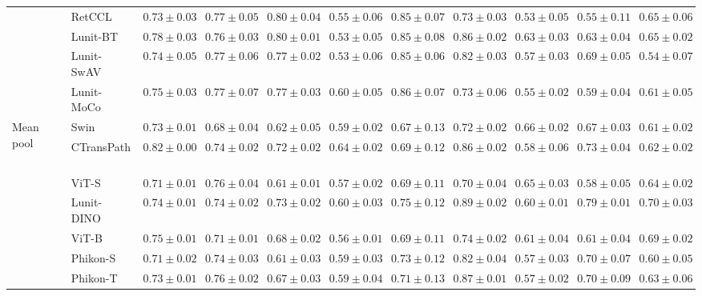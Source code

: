 \begin{tabular}{ll|cccc|c|cccc}
 & RetCCL~\cite{wang2023retccl} & $0.73 \pm 0.03$ & $0.77 \pm 0.05$ & $0.80 \pm 0.04$ & $0.55 \pm 0.06$ & $0.85 \pm 0.07$ & $0.73 \pm 0.03$ & $0.53 \pm 0.05$ & $0.55 \pm 0.11$ & $0.65 \pm 0.06$ \\
 & Lunit-BT~\cite{kang2023benchmarking} & $0.78 \pm 0.03$ & $0.76 \pm 0.03$ & $\mathbf{0.80 \pm 0.01}$ & $0.53 \pm 0.05$ & $0.85 \pm 0.08$ & $0.86 \pm 0.02$ & $\mathbf{0.63 \pm 0.03}$ & $0.63 \pm 0.04$ & $0.65 \pm 0.02$ \\
 & Lunit-SwAV~\cite{kang2023benchmarking} & $0.74 \pm 0.05$ & $0.77 \pm 0.06$ & $0.77 \pm 0.02$ & $0.53 \pm 0.06$ & $0.85 \pm 0.06$ & $0.82 \pm 0.03$ & $0.57 \pm 0.03$ & $0.69 \pm 0.05$ & $0.54 \pm 0.07$ \\
 & Lunit-MoCo~\cite{kang2023benchmarking} & $0.75 \pm 0.03$ & $0.77 \pm 0.07$ & $0.77 \pm 0.03$ & $0.60 \pm 0.05$ & $0.86 \pm 0.07$ & $0.73 \pm 0.06$ & $0.55 \pm 0.02$ & $0.59 \pm 0.04$ & $0.61 \pm 0.05$ \\
\cline{1-11}
\multirow[t]{12}{*}{Mean pool} & Swin~\cite{liu2021swin} & $0.73 \pm 0.01$ & $0.68 \pm 0.04$ & $0.62 \pm 0.05$ & $0.59 \pm 0.02$ & $0.67 \pm 0.13$ & $0.72 \pm 0.02$ & $\mathbf{0.66 \pm 0.02}$ & $0.67 \pm 0.03$ & $0.61 \pm 0.02$ \\
 & CTransPath~\cite{wang2022transformer} & $\mathbf{0.82 \pm 0.00}$ & $0.74 \pm 0.02$ & $0.72 \pm 0.02$ & $\mathbf{0.64 \pm 0.02}$ & $0.69 \pm 0.12$ & $0.86 \pm 0.02$ & $0.58 \pm 0.06$ & $0.73 \pm 0.04$ & $0.62 \pm 0.02$ \\
 & ViT-S~\cite{kolesnikov2021image} & $0.71 \pm 0.01$ & $0.76 \pm 0.04$ & $0.61 \pm 0.01$ & $0.57 \pm 0.02$ & $0.69 \pm 0.11$ & $0.70 \pm 0.04$ & $0.65 \pm 0.03$ & $0.58 \pm 0.05$ & $0.64 \pm 0.02$ \\
 & Lunit-DINO~\cite{kang2023benchmarking} & $0.74 \pm 0.01$ & $0.74 \pm 0.02$ & $\mathbf{0.73 \pm 0.02}$ & $0.60 \pm 0.03$ & $\mathbf{0.75 \pm 0.12}$ & $\mathbf{0.89 \pm 0.02}$ & $0.60 \pm 0.01$ & $\mathbf{0.79 \pm 0.01}$ & $\mathbf{0.70 \pm 0.03}$ \\
 & ViT-B~\cite{kolesnikov2021image} & $0.75 \pm 0.01$ & $0.71 \pm 0.01$ & $0.68 \pm 0.02$ & $0.56 \pm 0.01$ & $0.69 \pm 0.11$ & $0.74 \pm 0.02$ & $0.61 \pm 0.04$ & $0.61 \pm 0.04$ & $0.69 \pm 0.02$ \\
 & Phikon-S~\cite{filiot2023scaling} & $0.71 \pm 0.02$ & $0.74 \pm 0.03$ & $0.61 \pm 0.03$ & $0.59 \pm 0.03$ & $0.73 \pm 0.12$ & $0.82 \pm 0.04$ & $0.57 \pm 0.03$ & $0.70 \pm 0.07$ & $0.60 \pm 0.05$ \\
 & Phikon-T~\cite{filiot2023scaling} & $0.73 \pm 0.01$ & $0.76 \pm 0.02$ & $0.67 \pm 0.03$ & $0.59 \pm 0.04$ & $0.71 \pm 0.13$ & $0.87 \pm 0.01$ & $0.57 \pm 0.02$ & $0.70 \pm 0.09$ & $0.63 \pm 0.06$ \\

\end{tabular}
